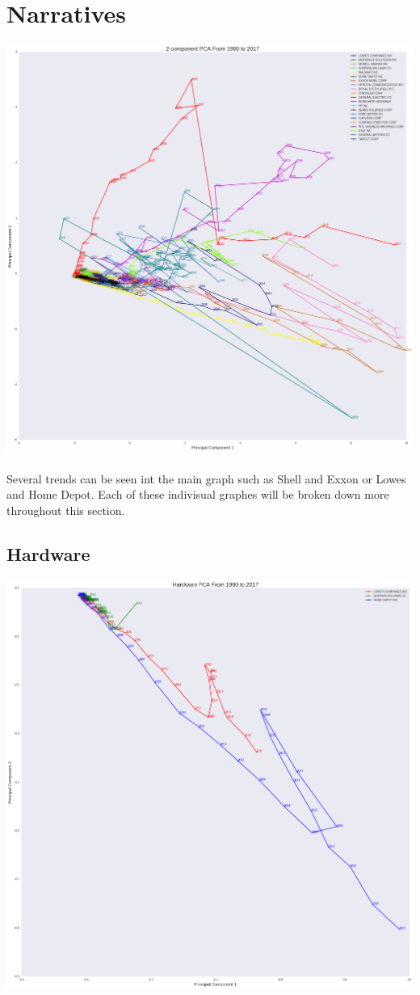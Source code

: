 \chapter{Narratives}
\includegraphics[width=1\textwidth]{./Main_Graph}\\[0.1in] \\

Several trends can be seen int the main graph such as Shell and Exxon or Lowes and Home Depot. Each of these indivisual graphes will be broken down more throughout this section.

\section{Hardware}
\includegraphics[width=1\textwidth]{./Hardware}\\[0.1in] \\
